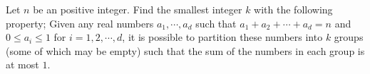 Let 
$n$
 be an positive integer. Find the smallest integer 
$k$
 with the following property; Given any real numbers 
$a_1 , \cdots , a_d $
 such that 
$a_1 + a_2 + \cdots + a_d = n$
 and 
$0 \le a_i \le 1$
 for 
$i=1,2,\cdots ,d$, 
 it is possible to partition these numbers into 
$k$
 groups (some of which may be empty) such that the sum of the numbers in each group is at most 
$1$.
